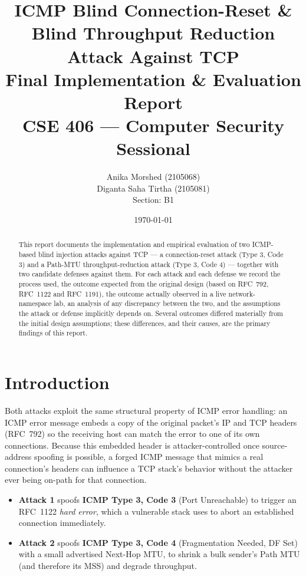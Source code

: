 \documentclass[11pt]{article}
\title{
    \textbf{ICMP Blind Connection-Reset \& Blind Throughput Reduction\\
    Attack Against TCP} \\
    \vspace{0.3cm}
    \large Final Implementation \& Evaluation Report \\
    \vspace{0.2cm}
    \large CSE 406 --- Computer Security Sessional
}
\author{
    Anika Morshed (2105068) \\
    Diganta Saha Tirtha (2105081) \\
    Section: B1
}
\date{\today}
\begin{document}
\maketitle

\begin{abstract}
This report documents the implementation and empirical evaluation of two
ICMP-based blind injection attacks against TCP --- a connection-reset
attack (Type 3, Code 3) and a Path-MTU throughput-reduction attack
(Type 3, Code 4) --- together with two candidate defenses against them.
For each attack and each defense we record the process used, the outcome
expected from the original design (based on RFC~792, RFC~1122 and
RFC~1191), the outcome actually observed in a live network-namespace
lab, an analysis of any discrepancy between the two, and the assumptions
the attack or defense implicitly depends on. Several outcomes differed
materially from the initial design assumptions; these differences, and
their causes, are the primary findings of this report.
\end{abstract}

\tableofcontents
\newpage

\section{Introduction}

Both attacks exploit the same structural property of ICMP error
handling: an ICMP error message embeds a copy of the original packet's
IP and TCP headers (RFC~792) so the receiving host can match the error
to one of its own connections. Because this embedded header is
attacker-controlled once source-address spoofing is possible, a forged
ICMP message that mimics a real connection's headers can influence a TCP
stack's behavior without the attacker ever being on-path for that
connection.

\begin{itemize}
    \item \textbf{Attack 1} spoofs \textbf{ICMP Type 3, Code 3} (Port
    Unreachable) to trigger an RFC~1122 \emph{hard error}, which a
    vulnerable stack uses to abort an established connection immediately.
    \item \textbf{Attack 2} spoofs \textbf{ICMP Type 3, Code 4}
    (Fragmentation Needed, DF Set) with a small advertised Next-Hop MTU,
    to shrink a bulk sender's Path MTU (and therefore its MSS) and
    degrade throughput.
\end{itemize}
\end{document}
